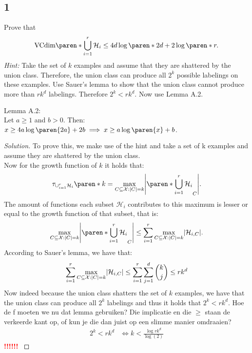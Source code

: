 \documentclass[10pt, a4paper, twoside]{amsart}
\theoremstyle{plain}
\DeclarePairedDelimiter\abs{\lvert}{\rvert}
\DeclarePairedDelimiter\paren()
\newcommand{\cH}{\ensuremath{\mathcal{H}}}
\newcommand{\cX}{\ensuremath{\mathcal{X}}}
\newenvironment{solution}
               {\let\oldqedsymbol=\qedsymbol
                \renewcommand{\qedsymbol}{$\blacktriangleleft$}
                \begin{proof}[Solution]}
               {\end{proof}
                \renewcommand{\qedsymbol}{\oldqedsymbol}}
\newcommand{\TODO}{\textcolor{red}{\textbf{!!!!!! }}}
\begin{document}
\subsection*{1}
Prove that
\begin{equation*}
  \text{VCdim}\paren*{\bigcup_{i=1}^r\cH_i}\leq 4d \log \paren*{2d} + 2 \log \paren*{r}.
\end{equation*}
\textit{Hint:} Take the set of $k$ examples and assume that they are shattered by the union class. Therefore, the union class can produce all $2^k$ possible labelings on these examples. Use Sauer's lemma to show that the union class cannot produce more than $rk^d$  labelings. Therefore $2^k < rk^d$. Now use Lemma A.2.

Lemma A.2:\\
Let $a \geq 1$ and $b>0$. Then: $x \geq 4a \log \paren{2a} +2b \implies x \geq a \log \paren{x}+b$.
\begin{solution}
  To prove this, we make use of the hint and take a set of k examples and assume they are shattered by the union class.\\
  Now for the growth function of $k$ it holds that:
  \begin{equation*}
    \tau_{\cup^r_{i=1} \cH_i}\paren*{k} = \max_{C\subseteq \cX : \abs{C} = k} \abs*{\paren*{\bigcup_{i=1}^r \cH_i}_C}.
  \end{equation*}
  The amount of functions each subset $\cH_i$ contributes to this maximum is lesser or equal to the growth function of that subset, that is:
  \begin{equation*}
    \max_{C\subseteq \cX : \abs{C} = k} \abs*{\paren*{\bigcup_{i=1}^r \cH_i}_C} \leq \sum_{i = 1}^r \max_{C\subseteq \cX : \abs{C} = k} \abs{\cH_{i,C}}.
  \end{equation*}
  According to Sauer's lemma, we have that:
  \begin{equation*}
    \sum_{i = 1}^r \max_{C\subseteq \cX : \abs{C} = k} \abs{\cH_{i,C}} \leq \sum_{i=1}^r \sum_{j=1}^d {k \choose j} \leq rk^d
  \end{equation*}
  Now indeed because the union class shatters the set of $k$ examples, we have that the union class can produce all $2^k$ labelings and thus it holds that $2^k < rk^d$. Hoe de f moeten we nu dat lemma gebruiken? Die implicatie en die $\geq$ staan de verkeerde kant op, of kun je die dan juist op een slimme manier omdraaien?
  \begin{align*}
    2^k < rk^d & \iff k < \frac{\log r k^d}{\log(2)}
  \end{align*}
\TODO
\end{solution}
\end{document}
